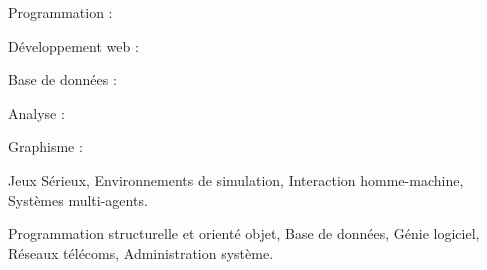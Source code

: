 







Programmation : \linebreak\linebreak
{} 

\divider\smallskip \linebreak
Développement web : \linebreak\linebreak
{}


\divider\smallskip \linebreak
Base de données : \linebreak\linebreak
{}

\divider\smallskip \linebreak
Analyse : \linebreak\linebreak
{}

\divider\smallskip \linebreak
Graphisme : \linebreak\linebreak
{}


\divider

\divider


\medskip


Jeux Sérieux, Environnements de simulation, Interaction homme-machine, Systèmes multi-agents.

\divider

Programmation structurelle et orienté objet, Base de données, Génie logiciel, Réseaux télécoms, Administration système. 

